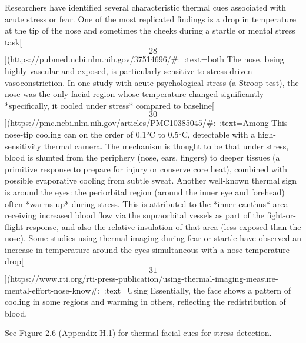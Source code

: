 \documentclass[12pt,a4paper]{article}
\begin{document}
Researchers have identified several characteristic thermal cues
associated with acute stress or fear. One of the most replicated
findings is a drop in temperature at the tip of the nose and sometimes
the cheeks during a startle or mental stress
task[\[28\]](https://pubmed.ncbi.nlm.nih.gov/37514696/#:~:text=both%
The nose, being highly vascular and exposed, is particularly sensitive
to stress-driven vasoconstriction. In one study with acute psychological
stress (a Stroop test), the nose was the only facial region whose
temperature changed significantly -- *specifically, it cooled under
stress* compared to
baseline[\[30\]](https://pmc.ncbi.nlm.nih.gov/articles/PMC10385045/#:~:text=Among%
This nose-tip cooling can on the order of 0.1°C to 0.5°C, detectable
with a high-sensitivity thermal camera. The mechanism is thought to be
that under stress, blood is shunted from the periphery (nose, ears,
fingers) to deeper tissues (a primitive response to prepare for injury
or conserve core heat), combined with possible evaporative cooling from
subtle sweat. Another well-known thermal sign is around the eyes: the
periorbital region (around the inner eye and forehead) often *warms up*
during stress. This is attributed to the *inner canthus* area receiving
increased blood flow via the supraorbital vessels as part of the
fight-or-flight response, and also the relative insulation of that area
(less exposed than the nose). Some studies using thermal imaging during
fear or startle have observed an increase in temperature around the eyes
simultaneous with a nose temperature
drop[\[31\]](https://www.rti.org/rti-press-publication/using-thermal-imaging-measure-mental-effort-nose-know#:~:text=Using%
Essentially, the face shows a pattern of cooling in some regions and
warming in others, reflecting the redistribution of blood.

See Figure 2.6 (Appendix H.1) for thermal facial cues for stress detection.
\end{document}
